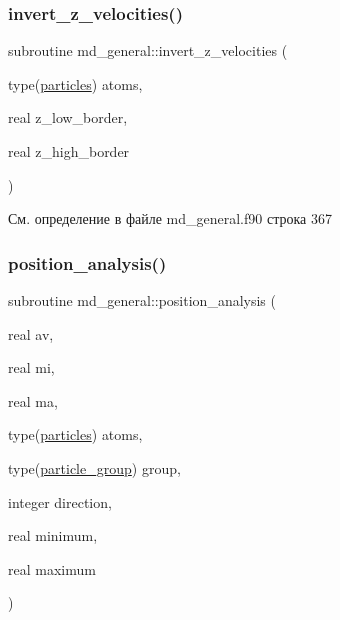 \subsubsection{\texorpdfstring{invert\+\_\+z\+\_\+velocities()}{invert\_z\_velocities()}}
{\footnotesize\ttfamily subroutine md\+\_\+general\+::invert\+\_\+z\+\_\+velocities (\begin{DoxyParamCaption}\item[{type(\mbox{\hyperlink{structmd__general_1_1particles}{particles}})}]{atoms,  }\item[{real}]{z\+\_\+low\+\_\+border,  }\item[{real}]{z\+\_\+high\+\_\+border }\end{DoxyParamCaption})}



См. определение в файле md\+\_\+general.\+f90 строка 367


\mbox{\label{namespacemd__general_a5dc45690a2125a86ce58d01601ebdf45}} 
\subsubsection{\texorpdfstring{position\+\_\+analysis()}{position\_analysis()}}
{\footnotesize\ttfamily subroutine md\+\_\+general\+::position\+\_\+analysis (\begin{DoxyParamCaption}\item[{real}]{av,  }\item[{real}]{mi,  }\item[{real}]{ma,  }\item[{type(\mbox{\hyperlink{structmd__general_1_1particles}{particles}})}]{atoms,  }\item[{type(\mbox{\hyperlink{structmd__general_1_1particle__group}{particle\+\_\+group}})}]{group,  }\item[{integer}]{direction,  }\item[{real}]{minimum,  }\item[{real}]{maximum }\end{DoxyParamCaption})}



